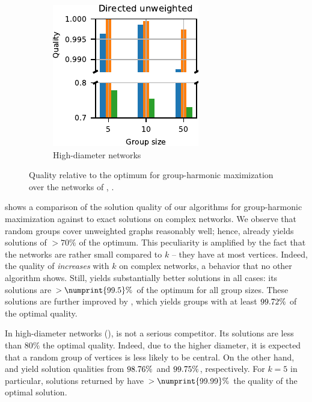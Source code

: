 \begin{figure}[tb]
\begin{subfigure}[t]{.5\textwidth}
\includegraphics[width=.49\textwidth]{./sources/plots/gh-gc-apx/quality-ilp-harmonic-high-diameter-directed-unweighted.pdf}
\caption{High-diameter networks}
\label{fig:gh-gc-apx:qual-vs-opt-gh-high-diam}
\end{subfigure}

\caption{Quality relative to the optimum for group-harmonic maximization over the networks of
, .}
\label{fig:gh-gc-apx:qual-vs-opt-gh}
\end{figure}

 shows a comparison of the solution
quality of our algorithms for group-harmonic maximization against to exact
solutions on complex networks. We observe that random groups cover unweighted
graphs reasonably well; hence, \bestrandomh already yields solutions of $>70\%$
of the optimum. This peculiarity is amplified by the fact that the networks are
rather small compared to $k$ -- they have at most  vertices.
Indeed, the quality of \bestrandomh \emph{increases} with $k$ on complex
networks, a behavior that no other algorithm shows. Still, \greedyh yields
substantially better solutions in all cases: its solutions are
$>\numprint{99.5}\%$ of the optimum for all group sizes. These solutions are
further improved by \greedylsh, which yields groups with at least
$\minQualLSGRHCplxUnw$ of the optimal quality.

In high-diameter networks (),
\bestrandomh is not a serious competitor. Its solutions are less than $80\%$
the optimal quality. Indeed, due to the higher diameter, it is expected
that a random group of vertices is less likely to be central.
On the other hand, \greedyh and \greedylsc yield solution qualities
from $\minQualGRHRoadUnw$ and $\minQualLSGRHRoadUnw$, respectively.
For $k = 5$ in particular, solutions returned by \greedylsh have
$>\numprint{99.99}\%$ the quality of the optimal solution.

